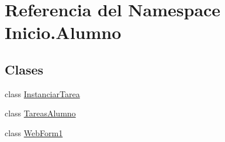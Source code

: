 \hypertarget{namespaceInicio_1_1Alumno}{}\section{Referencia del Namespace Inicio.\+Alumno}
\label{namespaceInicio_1_1Alumno}
\subsection*{Clases}
\begin{DoxyCompactItemize}
\item 
class \mbox{\hyperlink{classInicio_1_1Alumno_1_1InstanciarTarea}{Instanciar\+Tarea}}
\item 
class \mbox{\hyperlink{classInicio_1_1Alumno_1_1TareasAlumno}{Tareas\+Alumno}}
\item 
class \mbox{\hyperlink{classInicio_1_1Alumno_1_1WebForm1}{Web\+Form1}}
\end{DoxyCompactItemize}
